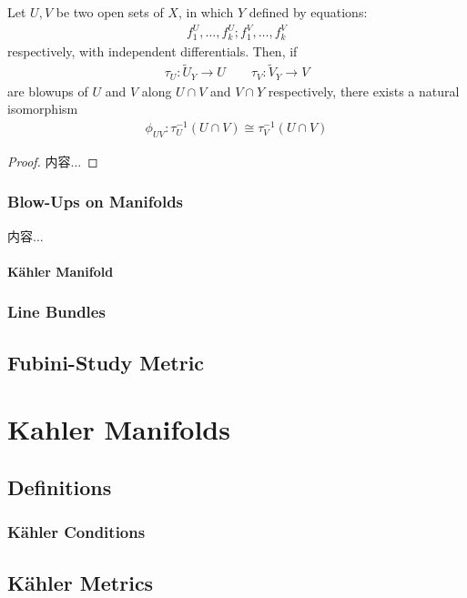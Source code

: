 \documentclass[Total.tex]{subfiles}
\begin{document}
			\begin{lemma}
				Let $U,V$ be two open sets of $X$, in which $Y$ defined by equations:
				\begin{gather*}
					f_1^U,\dots,f_k^U;f_1^V,\dots,f_k^V
				\end{gather*}
				respectively, with independent differentials. Then, if
				\begin{gather*}
					\tau_U:\tilde{U}_Y\rightarrow U\qquad \tau_V:\tilde{V}_Y\rightarrow V
				\end{gather*}
				are blowups of $U$ and $V$ along $U\cap V$ and $V\cap Y$ respectively, there exists a natural isomorphism
				\begin{gather*}
					\phi_{UV}:\tau_U^{-1}(U\cap V)\cong \tau_V^{-1}(U\cap V)
				\end{gather*}
			\end{lemma}
			\begin{proof}
				内容...
			\end{proof}
			\subsection{Blow-Ups on Manifolds}
				\begin{Def}
					内容...
				\end{Def}
				\subsubsection{K\"{a}hler Manifold}
			\subsection{Line Bundles}
		\section{Fubini-Study Metric}
	\chapter{Kahler Manifolds}
		\section{Definitions}
			\subsection{Kähler Conditions}
		\section{Kähler Metrics}
\end{document}
